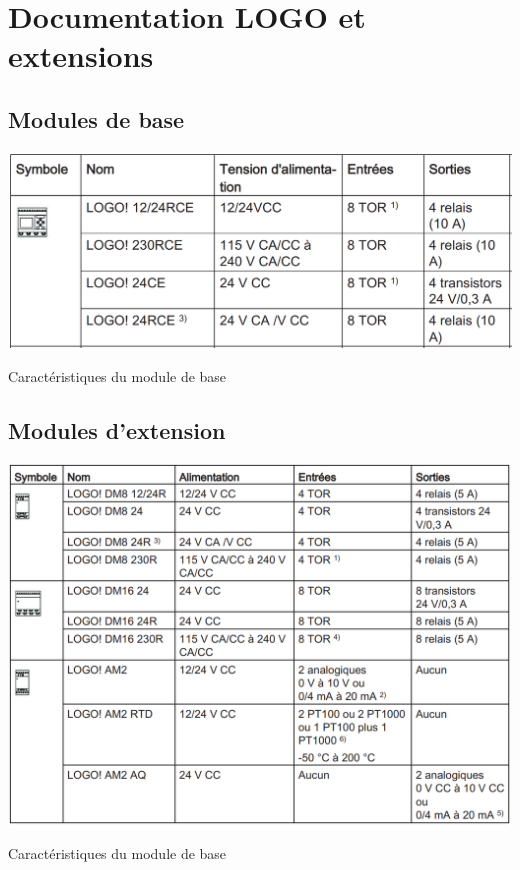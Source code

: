 \section{Documentation LOGO et extensions}
\subsection{Modules de base}
\begin{table}[h!]
    \centering
    \includegraphics[width=\textwidth,height=.4\textheight,keepaspectratio]{images/doc_base_logo}
    \caption{Caractéristiques du module de base}
\end{table}

\subsection{Modules d'extension}
\begin{table}[h!]
    \centering
    \includegraphics[width=\textwidth,height=.4\textheight,keepaspectratio]{images/doc_extension_logo.png}
    \caption{Caractéristiques du module de base}
\end{table}
\pagebreak
